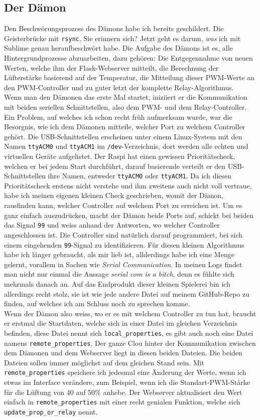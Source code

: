 \documentclass[12pt,titlepage,a4paper]{article}
\begin{document}
\clearpage

\subsection{Der Dämon} 
 Den Beschwörungsprozess des Dämons habe ich bereits geschildert.  Die Geisterbrücke mit \verb^rsync^, Sie erinnern sich? Jetzt geht es darum, \textit{was} ich mit Sublime genau heraufbeschwört habe. Die Aufgabe des Dämons ist es, alle Hintergrundprozesse abzuarbeiten, dazu gehören: Die Entgegennahme von neuen Werten, welche ihm der Flask-Webserver mitteilt, die Berechnung der Lüfterstärke basierend auf der Temperatur, die Mitteilung dieser PWM-Werte an den PWM-Controller und zu guter letzt der komplette Relay-Algorithmus. \\ Wenn man den Dämonen das erste Mal startet, iniziiert er die Kommunikation mit beiden seriellen Schnittstellen, also dem PWM-  und dem Relay-Controller. Ein Problem, auf welches ich schon recht früh aufmerksam wurde, war die Besorgnis, wie ich dem Dämonen mitteile, welcher Port zu welchem Controller gehört. Die USB-Schnittstellen erscheinen unter einem Linux-System mit den Namen  \verb^ttyACM0^ und \verb^ttyACM1^ im  \verb^/dev^-Verzeichnis, dort werden alle echten und virtuellen Geräte aufgelistet. Der Raspi hat einen gewissen Prioritätscheck, welchen er bei jedem Start durchführt, darauf basierende verteilt er den USB-Schnittstellen ihre Namen, entweder \verb^ttyACM0^ oder \verb^ttyACM1^. Da ich diesen Prioritätscheck erstens nicht verstehe und ihm zweitens auch nicht voll vertraue, habe ich meinen eigenen kleinen Check geschrieben, womit der Dämon, rausfinden kann, welcher Controller auf welchem Port zu erreichen ist. Um es ganz einfach auszudrücken, macht der Dämon beide Ports auf, schickt bei beiden das Signal  \verb^99^ und weiss anhand der Antworten, wo welcher Controller angeschlossen ist. Die Controller sind natürlich darauf programmiert, bei sich einem eingehenden  \verb^99^-Signal zu identifizieren. Für diesen kleinen Algorithmus habe ich länger gebraucht, als mir lieb ist, allderdings habe ich eine Menge gelernt, vorallem in Sachen wie \textit{Serial Communication}. In meinen Logs findet man nicht nur einmal die Aussage \textit{serial com is a bitch}, denn es fühlte sich mehrmals danach an. Auf das Endprodukt dieser kleinen Spielerei bin ich allerdings recht stolz, sie ist wie jede andere Datei auf meinem GitHub-Repo zu finden, auf welches ich am Schluss noch zu sprechen komme.\\Wenn der Dämon also weiss, wo er es mit welchem Controller zu tun hat, braucht er erstmal die Startdaten, welche sich in einer Datei im gleichen Verzeichnis befinden, diese Datei nennt sich  \verb^local_properties^, es gibt auch noch eine Datei namens  \verb^remote_properties^. Der ganze Clou hinter der Kommunikation zwischen dem Dämonen und dem Webserver liegt in diesen beiden Dateien. Die beiden Dateien sollen immer möglichst auf dem gleichen Stand sein. Mit \verb^remote_properties^ speichere ich jedesmal eine Änderung der Werte, wenn ich etwas im Interface verändere, zum Beispiel, wenn ich die Standart-PWM-Stärke für die Lüftung von 40 auf 50\% anhebe. Der Webserver aktualisiert den Wert einfach in \verb^remote_properties^ mit einer recht genialen Funktion, welche sich \verb^update_prop_or_relay^ nennt.
\end{document}
